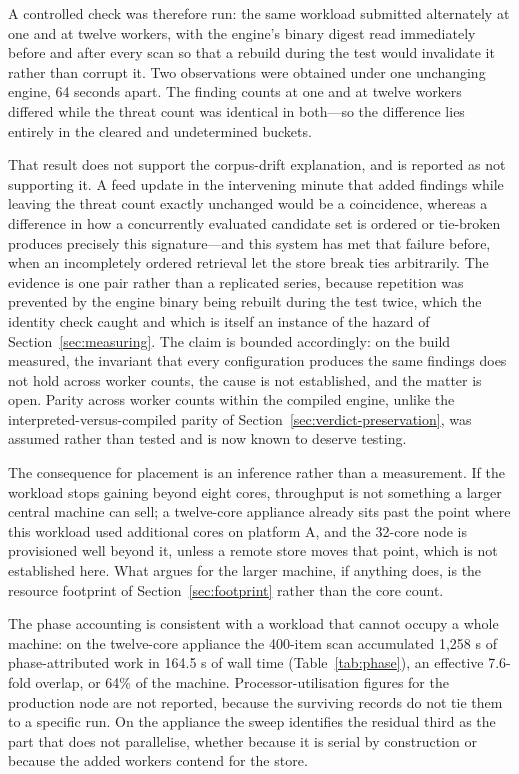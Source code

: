 \documentclass[fleqn,10pt,lineno]{wlpeerj}
\begin{document}
A controlled check was therefore run: the same workload submitted alternately at one and at twelve workers, with the engine's binary digest read immediately before and after every scan so that a rebuild during the test would invalidate it rather than corrupt it. Two observations were obtained under one unchanging engine, 64 seconds apart. The finding counts at one and at twelve workers differed while the threat count was identical in both---so the difference lies entirely in the cleared and undetermined buckets.

That result does not support the corpus-drift explanation, and is reported as not supporting it. A feed update in the intervening minute that added findings while leaving the threat count exactly unchanged would be a coincidence, whereas a difference in how a concurrently evaluated candidate set is ordered or tie-broken produces precisely this signature---and this system has met that failure before, when an incompletely ordered retrieval let the store break ties arbitrarily. The evidence is one pair rather than a replicated series, because repetition was prevented by the engine binary being rebuilt during the test twice, which the identity check caught and which is itself an instance of the hazard of Section~\ref{sec:measuring}. The claim is bounded accordingly: on the build measured, the invariant that every configuration produces the same findings does not hold across worker counts, the cause is not established, and the matter is open. Parity across worker counts within the compiled engine, unlike the interpreted-versus-compiled parity of Section~\ref{sec:verdict-preservation}, was assumed rather than tested and is now known to deserve testing.

The consequence for placement is an inference rather than a measurement. If the workload stops gaining beyond eight cores, throughput is not something a larger central machine can sell; a twelve-core appliance already sits past the point where this workload used additional cores on platform A, and the 32-core node is provisioned well beyond it, unless a remote store moves that point, which is not established here. What argues for the larger machine, if anything does, is the resource footprint of Section~\ref{sec:footprint} rather than the core count.

The phase accounting is consistent with a workload that cannot occupy a whole machine: on the twelve-core appliance the 400-item scan accumulated 1,258 s of phase-attributed work in 164.5 s of wall time (Table~\ref{tab:phase}), an effective 7.6-fold overlap, or 64\% of the machine. Processor-utilisation figures for the production node are not reported, because the surviving records do not tie them to a specific run. On the appliance the sweep identifies the residual third as the part that does not parallelise, whether because it is serial by construction or because the added workers contend for the store.
\end{document}
